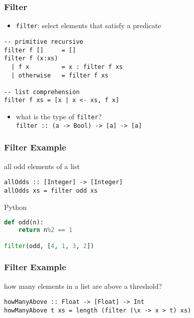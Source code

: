 \documentclass[dvipsnames]{beamer}
\theoremstyle{plain}
\begin{document}
\begin{frame}[fragile]
  \frametitle{Filter}

  \begin{itemize}
    \item \lstinline|filter|: select elements that satisfy a predicate
  \end{itemize}

  \begin{exampleblock}{}
    \begin{lstlisting}[deletekeywords={filter}]
-- primitive recursive
filter f []     = []
filter f (x:xs)
  | f x         = x : filter f xs
  | otherwise   = filter f xs

-- list comprehension
filter f xs = [x | x <- xs, f x]
    \end{lstlisting}
  \end{exampleblock}

  \pause
  \begin{itemize}
    \item what is the type of \lstinline|filter|?\\
      \lstinline|filter :: (a -> Bool) -> [a] -> [a]|
  \end{itemize}
\end{frame}

\begin{frame}[fragile]
  \frametitle{Filter Example}

  \begin{exampleblock}{all odd elements of a list}
    \begin{lstlisting}
allOdds :: [Integer] -> [Integer]
allOdds xs = filter odd xs
    \end{lstlisting}
  \end{exampleblock}

  \bigskip
  \begin{exampleblock}{Python}
    \begin{lstlisting}[language=Python]
def odd(n):
    return n%2 == 1

filter(odd, [4, 1, 3, 2])
    \end{lstlisting}
  \end{exampleblock}
\end{frame}

\begin{frame}[fragile]
  \frametitle{Filter Example}

  \begin{exampleblock}{how many elements in a list are above a threshold?}
    \begin{lstlisting}
howManyAbove :: Float -> [Float] -> Int
howManyAbove t xs = length (filter (\x -> x > t) xs)
    \end{lstlisting}
  \end{exampleblock}
\end{frame}
\end{document}
